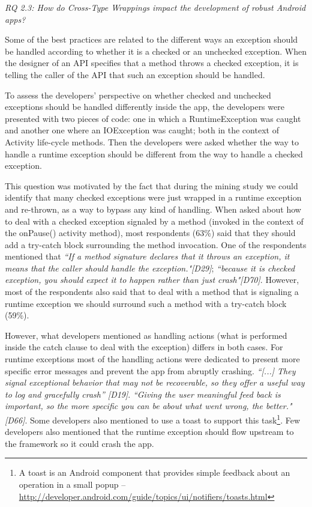 \bigskip 


\bigskip 
\noindent\emph{RQ 2.3: How do Cross-Type Wrappings impact the development of robust Android apps?}

\bigskip

Some of the best practices are related to the different ways an exception should be handled according to whether it is a checked or an unchecked exception. When the designer of an API specifies that a method throws a checked exception, it is telling the caller of the API that such an exception should be handled. 

To assess the developers' perspective on whether checked and unchecked exceptions should be handled differently inside the app, the developers were presented with two pieces of code: one in which a RuntimeException was caught and another one where an IOException was caught; both in the context of Activity life-cycle methods. Then the developers were asked whether the way to handle a runtime exception should be different from the way to handle a checked exception. 

This question was motivated by the fact that during the mining study we could identify that many checked exceptions were just wrapped in a runtime exception and re-thrown, as a way to bypass any kind of handling. When asked about how to deal with a checked exception signaled by a method (invoked in the context of the onPause() activity method), most respondents (63\%) said that they should add a try-catch block surrounding the method invocation. One of the respondents mentioned that \emph{``If a method signature declares that it throws an exception, it means that the caller should handle the exception."[D29]}; \emph{``because it is checked exception, you should expect it to happen rather than just crash"[D70]}. However, most of the respondents also said that to deal with a method that is signaling a runtime exception we should surround such a method with a try-catch block (59\%). 

However, what developers mentioned as handling actions (what is performed inside the catch clause to deal with the exception) differs in both cases. For runtime exceptions most of the handling actions were dedicated to present more specific error messages and prevent the app from abruptly crashing. \emph{``[...] They signal exceptional behavior that may not be recoverable, so they offer a useful way to log and gracefully crash'' [D19]}. \emph{``Giving the user meaningful feed back is important, so the more specific you can be about what went wrong, the better."[D66]}. Some developers also mentioned to use a toast to support this task\footnote{A toast is an Android component that provides simple feedback about an operation in a small popup -- \url{http://developer.android.com/guide/topics/ui/notifiers/toasts.html}}. Few developers also mentioned that the runtime exception should flow upstream to the framework so it could crash the app.

